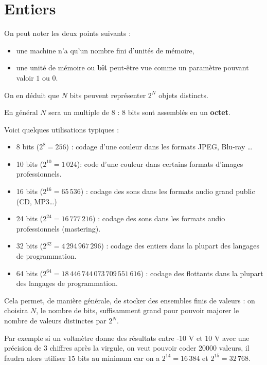 \chapter{Entiers}
\thispagestyle{empty}
{\sf On peut noter les deux points suivants :
\begin{itemize}
\item une machine n'a qu'un nombre fini d'unités de mémoire,
\item une unité de mémoire ou {\bf bit} peut-être vue comme un paramètre pouvant valoir $1$ ou $0$.
\end{itemize}

On en déduit que $N$ bits peuvent représenter $2^N$ objets distincts.

En général $N$ sera un multiple de 8 : 8 bits sont assemblés en un {\bf octet}.

Voici quelques utilisations typiques :
\begin{itemize}
\item 8  bits ($2^8=256$) : codage d'une couleur dans les formats JPEG, Blu-ray \dots
\item 10  bits  ($2^{10}=1\,024$): code d'une couleur dans certains formats d'images professionnels.
\item 16  bits ($2^{16}=65\,536$) : codage des sons dans les formats audio grand public (CD, MP3\dots)
\item 24  bits ($2^{24}=16\,777\,216$) : codage des sons dans les formats audio professionnels (mastering).
\item 32  bits ($2^{32}=4\,294\,967\,296$) : codage des entiers dans la plupart des langages de programmation.
\item 64  bits ($2^{64}=18\,446\,744\,073\,709\,551\,616$) : codage des flottants dans la plupart des langages de programmation.
\end{itemize} 

Cela permet, de manière générale, de stocker des ensembles finis de valeurs : on choisira $N$, le nombre de bits, suffisamment grand pour pouvoir majorer le nombre de valeurs distinctes par $2^N$.

Par exemple si un voltmètre donne des résultats entre -10 V et 10 V avec une précision de 3 chiffres après la virgule, on veut pouvoir coder 20000 valeurs, il faudra alors utiliser 15 bits au minimum car on a $2^{14} = 16\,384$ et $2^{15} = 32\,768$.
}
